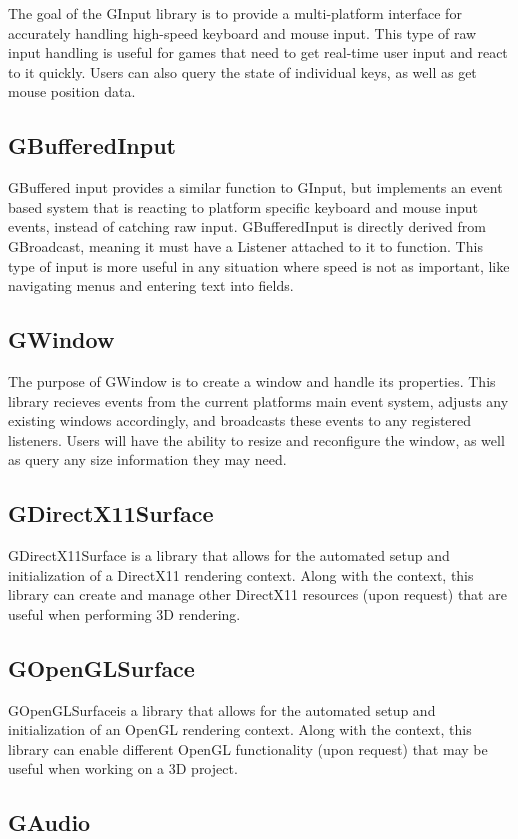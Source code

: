 The goal of the G\+Input library is to provide a multi-\/platform interface for accurately handling high-\/speed keyboard and mouse input. This type of raw input handling is useful for games that need to get real-\/time user input and react to it quickly. Users can also query the state of individual keys, as well as get mouse position data.\hypertarget{index_APIGBufferedInput}{}\subsection{G\+Buffered\+Input}\label{index_APIGBufferedInput}
G\+Buffered input provides a similar function to G\+Input, but implements an event based system that is reacting to platform specific keyboard and mouse input events, instead of catching raw input. G\+Buffered\+Input is directly derived from G\+Broadcast, meaning it must have a Listener attached to it to function. This type of input is more useful in any situation where speed is not as important, like navigating menus and entering text into fields.\hypertarget{index_APIGWindow}{}\subsection{G\+Window}\label{index_APIGWindow}
The purpose of G\+Window is to create a window and handle it\textquotesingle{}s properties. This library recieves events from the current platform\textquotesingle{}s main event system, adjusts any existing windows accordingly, and broadcasts these events to any registered listeners. Users will have the ability to resize and reconfigure the window, as well as query any size information they may need.\hypertarget{index_APIGDirectX11Surface}{}\subsection{G\+Direct\+X11\+Surface}\label{index_APIGDirectX11Surface}
G\+Direct\+X11\+Surface is a library that allows for the automated setup and initialization of a Direct\+X11 rendering context. Along with the context, this library can create and manage other Direct\+X11 resources (upon request) that are useful when performing 3D rendering.\hypertarget{index_APIGOpenGLSurface}{}\subsection{G\+Open\+G\+L\+Surface}\label{index_APIGOpenGLSurface}
G\+Open\+G\+L\+Surfaceis a library that allows for the automated setup and initialization of an Open\+GL rendering context. Along with the context, this library can enable different Open\+GL functionality (upon request) that may be useful when working on a 3D project.\hypertarget{index_APIGAudio}{}\subsection{G\+Audio}\label{index_APIGAudio}

